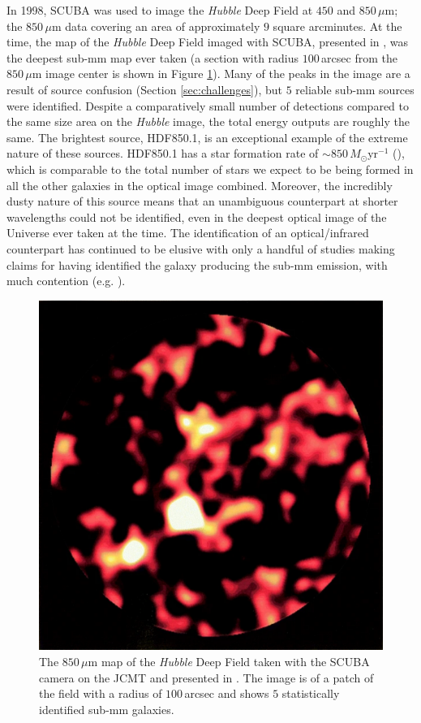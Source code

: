 In 1998, SCUBA was used to image the \textit{Hubble} Deep Field at $450$ and $850\,\mu$m; the $850\,\mu$m data covering an area of approximately $9$ square arcminutes. At the time, the map of the \textit{Hubble} Deep Field imaged with SCUBA, presented in \citealt{Hughes_1998}, was the deepest sub-mm map ever taken (a section with radius $100\,$arcsec from the $850\,\mu$m image center is shown in Figure \ref{fig:hubble_deep_field_scuba}). Many of the peaks in the image are a result of source confusion (Section \ref{sec:challenges}), but $5$ reliable sub-mm sources were identified. Despite a comparatively small number of detections compared to the same size area on the \textit{Hubble} image, the total energy outputs are roughly the same. The brightest source, HDF850.1, is an exceptional example of the extreme nature of these sources. HDF850.1 has a star formation rate of $\sim 850\,M_\odot$yr$^{-1}$ (\citealt{Walter_2012}), which is comparable to the total number of stars we expect to be being formed in all the other galaxies in the optical image combined. Moreover, the incredibly dusty nature of this source means that an unambiguous counterpart at shorter wavelengths could not be identified, even in the deepest optical image of the Universe ever taken at the time. The identification of an optical/infrared counterpart has continued to be elusive with only a handful of studies making claims for having identified the galaxy producing the sub-mm emission, with much contention (e.g. \citealt{Dunlop_2004, Serjeant_2014, Sun_2023}).

\begin{figure}
    \centering
	\includegraphics[width=0.64\columnwidth]{Figures/hubble_deep_field_scuba.pdf}
	\caption[Hubble Deep Field as captured by SCUBA on the JCMT]{The $850\,\mu$m map of the \textit{Hubble} Deep Field taken with the SCUBA camera on the JCMT and presented in \citealt{Hughes_1998}. The image is of a patch of the field with a radius of $100\,$arcsec and shows $5$ statistically identified sub-mm galaxies.}
	\label{fig:hubble_deep_field_scuba}
\end{figure}


